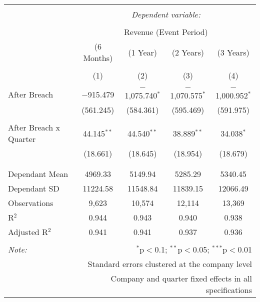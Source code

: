 
\begin{table}[!htbp] \centering 
  \caption{} 
  \label{} 
\begin{tabular}{@{\extracolsep{5pt}}lcccc} 
\\[-1.8ex]\hline 
\hline \\[-1.8ex] 
 & \multicolumn{4}{c}{\textit{Dependent variable:}} \\ 
\cline{2-5} 
\\[-1.8ex] & \multicolumn{4}{c}{Revenue (Event Period)} \\ 
 & (6 Months) & (1 Year) & (2 Years) & (3 Years) \\ 
\\[-1.8ex] & (1) & (2) & (3) & (4)\\ 
\hline \\[-1.8ex] 
 After Breach & $-$915.479 & $-$1,075.740$^{*}$ & $-$1,070.575$^{*}$ & $-$1,000.952$^{*}$ \\ 
  & (561.245) & (584.361) & (595.469) & (591.975) \\ 
  & & & & \\ 
 After Breach x Quarter & 44.145$^{**}$ & 44.540$^{**}$ & 38.889$^{**}$ & 34.038$^{*}$ \\ 
  & (18.661) & (18.645) & (18.954) & (18.679) \\ 
  & & & & \\ 
\hline \\[-1.8ex] 
Dependant Mean & 4969.33 & 5149.94 & 5285.29 & 5340.45 \\ 
Dependant SD & 11224.58 & 11548.84 & 11839.15 & 12066.49 \\ 
Observations & 9,623 & 10,574 & 12,114 & 13,369 \\ 
R$^{2}$ & 0.944 & 0.943 & 0.940 & 0.938 \\ 
Adjusted R$^{2}$ & 0.941 & 0.941 & 0.937 & 0.936 \\ 
\hline 
\hline \\[-1.8ex] 
\textit{Note:}  & \multicolumn{4}{r}{$^{*}$p$<$0.1; $^{**}$p$<$0.05; $^{***}$p$<$0.01} \\ 
 & \multicolumn{4}{r}{Standard errors clustered at the company level} \\ 
 & \multicolumn{4}{r}{Company and quarter fixed effects in all specifications} \\ 
\end{tabular} 
\end{table} 
